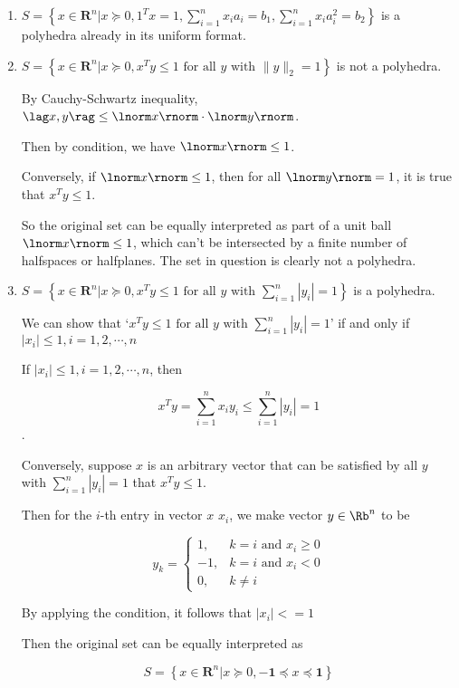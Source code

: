 \begin{solution}
\begin{enumerate}
{}

\item { $S=\left\{x \in \mathbf{R}^{n} | x \succeq 0,1^{T} x=1, \sum_{i=1}^{n} x_{i} a_{i}=b_{1}, \sum_{i=1}^{n} x_{i} a_{i}^{2}=b_{2}\right\}$ is a polyhedra already in its uniform format.
}

\item { $S=\left\{x \in \mathbf{R}^{n} | x \succeq 0, x^{T} y \leq 1 \text { for all } y \text { with }\|y\|_{2}=1\right\}$ is not a polyhedra.

By Cauchy-Schwartz inequality, $\lag x,y \rag \leq \lnorm x \rnorm \cdot \lnorm y \rnorm $.

Then by condition, we have $\lnorm x \rnorm \leq 1$.

Conversely, if $\lnorm x \rnorm \leq 1$, then for all $\lnorm y \rnorm = 1$, it is true that $x^{T} y \leq 1$.

So the original set can be equally interpreted as part of a unit ball $\lnorm x \rnorm \leq 1$, which can't be intersected by a finite number of halfspaces or halfplanes. The set in question is clearly not a polyhedra.
}

\item { $S=\left\{x \in \mathbf{R}^{n} | x \succeq 0, x^{T} y \leq 1 \text { for all } y \text { with } \sum_{i=1}^{n}\left|y_{i}\right|=1\right\} $ is a polyhedra.

We can show that `$x^{T} y \leq 1 \text { for all } y \text { with } \sum_{i=1}^{n}\left|y_{i}\right|=1$' if and only if $\left| x_i \right| \leq 1, i = 1,2,\cdots ,n$

If $\left| x_i \right| \leq 1, i = 1,2,\cdots ,n$, then

$$x^{T} y = \sum_{i=1}^n x_i y_i \leq \sum_{i=1}^n \left| y_i \right| = 1 $$.

Conversely, suppose $x$ is an arbitrary vector that can be satisfied by all $y$ with $\sum_{i=1}^{n}\left|y_{i}\right|=1$ that $x^{T} y \leq 1$.

Then for the $i$-th entry in vector $x$ $x_i$, we make vector $y \in \Rb^n$ to be

$$
y_k = \begin{cases}
1, &k = i  \text{ and } x_i \geq 0 \\
-1, &k = i \text{ and } x_i < 0 \\
0, &k \neq i
\end{cases}$$

By applying the condition, it follows that $\left| x_i \right| <= 1$

Then the original set can be equally interpreted as

$$ S = \left\{x \in \mathbf{R}^{n} | x \succeq 0, - \mathbf{1} \preceq x \preceq \mathbf{1} \right\} $$

}

\end{enumerate}

\end{solution}


